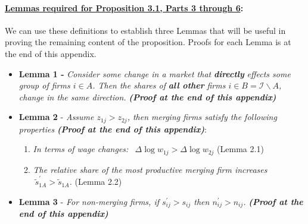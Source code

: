 \documentclass[12pt]{article}
\theoremstyle{prop}
\begin{document}
\paragraph{\underline{Lemmas required for Proposition 3.1, Parts 3 through 6}: } We can use these definitions to establish three
Lemmas that will be useful in proving the remaining content of the
proposition. Proofs for each Lemma is at the end of this appendix.
\begin{itemize}
	\item \textbf{Lemma 1 - }\emph{Consider some change in a market that }\textbf{\emph{directly
	}}\emph{effects some group of firms $i\in A$. Then the shares of
	}\textbf{\emph{all other}}\emph{ firms $i\in B=\mathcal{I}\backslash A$,
		change in the same direction. }\textbf{\emph{(Proof at the end of
			this appendix)}}
	\item \textbf{Lemma 2 }- \emph{Assume  ${z_{1j}>z_{2j}}$, then merging firms satisfy the following properties} \textbf{\emph{(Proof at the
			end of this appendix)}}:
	\begin{enumerate}
		\item \emph{In terms of wage changes: $ \ \ \Delta\log w_{1j}>\Delta\log w_{2j}$} (Lemma 2.1)
		\item \emph{The relative share of the most productive  merging firm increases $\  \widetilde{s}_{1A}^{\prime}>\widetilde{s}_{1A}$.} (Lemma 2.2)
	\end{enumerate}
	\item \textbf{Lemma 3 }- \emph{For non-merging firms, if $s_{ij}^{\prime}>s_{ij}$
		then $n_{ij}^{\prime}>n_{ij}$. }\textbf{\emph{(Proof at the end of
			this appendix)}}
\end{itemize}

 \bigskip

 
\end{document}
